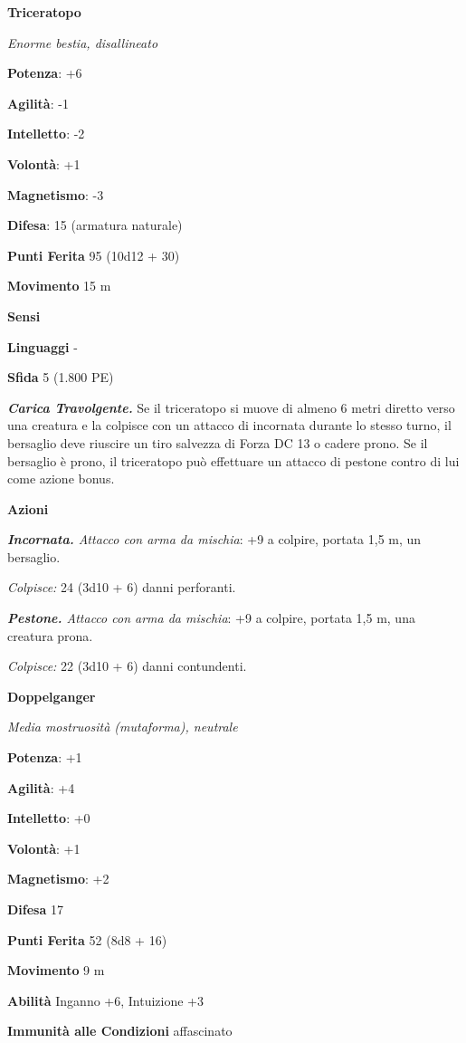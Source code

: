 \begin{multicols}{2}
\textbf{Triceratopo}

\emph{Enorme bestia, disallineato}

\textbf{Potenza}: +6

\textbf{Agilità}: -1

\textbf{Intelletto}: -2

\textbf{Volontà}: +1

\textbf{Magnetismo}: -3

\textbf{Difesa}: 15 (armatura naturale)

\textbf{Punti Ferita} 95 (10d12 + 30)

\textbf{Movimento} 15 m

\textbf{Sensi} 

\textbf{Linguaggi} -

\textbf{Sfida} 5 (1.800 PE)

\emph{\textbf{Carica Travolgente.}} Se il triceratopo si muove di almeno
6 metri diretto verso una creatura e la colpisce con un attacco di
incornata durante lo stesso turno, il bersaglio deve riuscire un tiro
salvezza di Forza DC 13 o cadere prono. Se il bersaglio è prono, il
triceratopo può effettuare un attacco di pestone contro di lui come
azione bonus.

\textbf{Azioni}

\emph{\textbf{Incornata.} Attacco con arma da mischia}: +9 a colpire,
portata 1,5 m, un bersaglio.

\emph{Colpisce:} 24 (3d10 + 6) danni perforanti.

\emph{\textbf{Pestone.} Attacco con arma da mischia}: +9 a colpire,
portata 1,5 m, una creatura prona.

\emph{Colpisce:} 22 (3d10 + 6) danni contundenti.



\textbf{Doppelganger}

\emph{Media mostruosità (mutaforma), neutrale}

\textbf{Potenza}: +1

\textbf{Agilità}: +4

\textbf{Intelletto}: +0

\textbf{Volontà}: +1

\textbf{Magnetismo}: +2

\textbf{Difesa} 17

\textbf{Punti Ferita} 52 (8d8 + 16)

\textbf{Movimento} 9 m

\textbf{Abilità} Inganno +6, Intuizione +3

\textbf{Immunità alle Condizioni} affascinato


\end{multicols}
